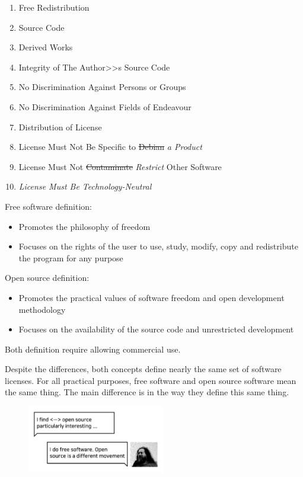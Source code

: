 \documentclass[10pt, a5paper]{article}
\begin{document}
\begin{enumerate}
  \item Free Redistribution
  \item Source Code
  \item Derived Works
  \item Integrity of The Author>>s Source Code
  \item No Discrimination Against Persons or Groups
  \item No Discrimination Against Fields of Endeavour
  \item Distribution of License
  \item License Must Not Be Specific to \st{Debian} \emph{a Product}
  \item License Must Not \st{Contaminate} \emph{Restrict} Other Software
  \item \emph{License Must Be Technology-Neutral}
\end{enumerate}

Free software definition:

\begin{itemize}
  \item Promotes the philosophy of freedom
  \item Focuses on the rights of the user to use, study, modify, copy and redistribute the program for any purpose
\end{itemize}

Open source definition:

\begin{itemize}
  \item Promotes the practical values of software freedom and open development methodology
  \item Focuses on the availability of the source code and unrestricted development
\end{itemize}

Both definition require allowing commercial use.

Despite the differences, both concepts define nearly the same set of software licenses. For all practical purposes, free software and open source software mean the same thing. The main difference is in the way they define this same thing.

\begin{center}
\begin{figure}[h!]
  \centering
  \includegraphics[width=6cm]{14_2019_Shadura6.png}
  
  \label{fig4}
\end{figure}
\end{center}
\end{document}
